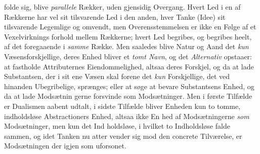 folde sig, blive \emph{parallele} Rækker, uden gjensidig Overgang.
Hvert Led i en af Rækkerne har vel sit tilsvarende Led i den
anden, hver Tanke (Idee) sit tilsvarende Legemlige og omvendt,
men Overensstemmelsen er ikke en Følge af et Vexelvirknings\-%
forhold mellem Rækkerne; hvert Led begribes, og begribes
heelt, af det foregaaende i \emph{samme} Række. Men saaledes blive
Natur og Aand det \emph{kun} Væsensforskjellige, deres Enhed bliver
et \emph{tomt Navn}, og det \emph{Alternativ} opstaaer: at fastholde
Attributernes Eiendommelighed, altsaa deres Forskjel, og da at
lade Substantsen, der i sit ene Væsen skal forene det \emph{kun}
Forskjellige, det ved hinanden Ubegribelige, sprænges; eller at
søge at bevare Substantsens Enhed, og da at lade Modsætnin\-%
gerne forsvinde som Modsætninger. Men i første Tilfælde er
Dualismen aabent udtalt, i sidste Tilfælde bliver Enheden kun
to tomme, indholdsløse Abstractioners Enhed, altsaa ikke En\-%
hed af Modsætningerne \emph{som} Modsætninger, men kun det Ind\-%
holdsløse, i hvilket to Indholdsløse falde sammen, og idet
Tanken nu atter vender sig mod den concrete Tilværelse, er
Modsætningen der igjen som uforsonet.

